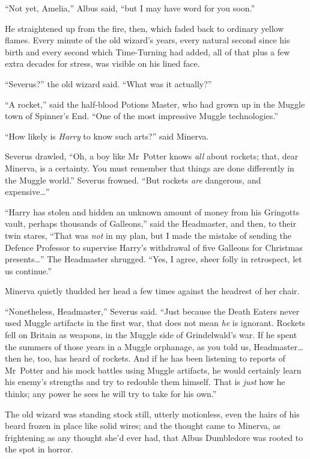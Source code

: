 “Not yet, Amelia,” Albus said, “but I may have word for you soon.”

He straightened up from the fire, then, which faded back to ordinary yellow flames. Every minute of the old wizard’s years, every natural second since his birth and every second which Time-Turning had added, all of that plus a few extra decades for stress, was visible on his lined face.

“Severus?” the old wizard said. “What was it actually?”

“A rocket,” said the half-blood Potions Master, who had grown up in the Muggle town of Spinner’s End. “One of the most impressive Muggle technologies.”

“How likely is \emph{Harry} to know such arts?” said Minerva.

Severus drawled, “Oh, a boy like Mr~Potter knows \emph{all} about rockets; that, dear Minerva, is a certainty. You must remember that things are done differently in the Muggle world.” Severus frowned. “But rockets \emph{are} dangerous, and expensive…”

“Harry has stolen and hidden an unknown amount of money from his Gringotts vault, perhaps thousands of Galleons,” said the Headmaster, and then, to their twin stares, “That was \emph{not} in my plan, but I made the mistake of sending the Defence Professor to supervise Harry’s withdrawal of five Galleons for Christmas presents…” The Headmaster shrugged. “Yes, I agree, sheer folly in retrospect, let us continue.”

Minerva quietly thudded her head a few times against the headrest of her chair.

“Nonetheless, Headmaster,” Severus said. “Just because the Death Eaters never used Muggle artifacts in the first war, that does not mean \emph{he} is ignorant. Rockets fell on Britain as weapons, in the Muggle side of Grindelwald’s war. If he spent the summers of those years in a Muggle orphanage, as you told us, Headmaster…then he, too, has heard of rockets. And if he has been listening to reports of Mr~Potter and his mock battles using Muggle artifacts, he would certainly learn his enemy’s strengths and try to redouble them himself. That is \emph{just} how he thinks; any power he sees he will try to take for his own.”

The old wizard was standing stock still, utterly motionless, even the hairs of his beard frozen in place like solid wires; and the thought came to Minerva, as frightening as any thought she’d ever had, that Albus Dumbledore was rooted to the spot in horror.

